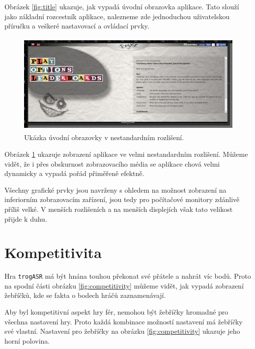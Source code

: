Obrázek \ref{fig:title} ukazuje, jak vypadá úvodní obrazovka aplikace. Tato slouží jako základní rozcestník aplikace, nalezneme zde jednoduchou uživatelskou příručku a veškeré nastavovací a ovládací prvky.

\begin{figure}[h]
	\centering
	\includegraphics[width=140mm,height=50mm]{img/title_stretch.jpg}
	\caption{Ukázka úvodní obrazovky v nestandardním rozlišení.}
	\label{fig:title_stretch}
\end{figure}

Obrázek \ref{fig:title_stretch} ukazuje zobrazení aplikace ve velmi nestandardním rozlišení. Můžeme vidět, že i přes obskurnost zobrazovacího média se aplikace chová velmi dynamicky a vypadá pořád přiměřeně efektně.

Všechny grafické prvky jsou navrženy s ohledem na možnost zobrazení na inferiorním zobrazovacím zařízení, jsou tedy pro počítačové monitory zdánlivě příliš velké. V menších rozlišeních a na menších displejích však tato velikost přijde k duhu.

\section{Kompetitivita}

Hra \verb|trogASR| má být hnána touhou překonat své přátele a nahrát víc bodů. Proto na spodní části obrázku \ref{fig:competitivity} můžeme vidět, jak vypadá zobrazení žebříčků, kde se fakta o bodech hráčů zaznamenávají. 

Aby byl kompetitivní aspekt hry fér, nemohou být žebříčky hromadné pro všechna nastavení hry. Proto každá kombinace možností nastavení má žebříčky své vlastní. Nastavení pro žebříčky na obrázku \ref{fig:competitivity} ukazuje jeho horní polovina.

